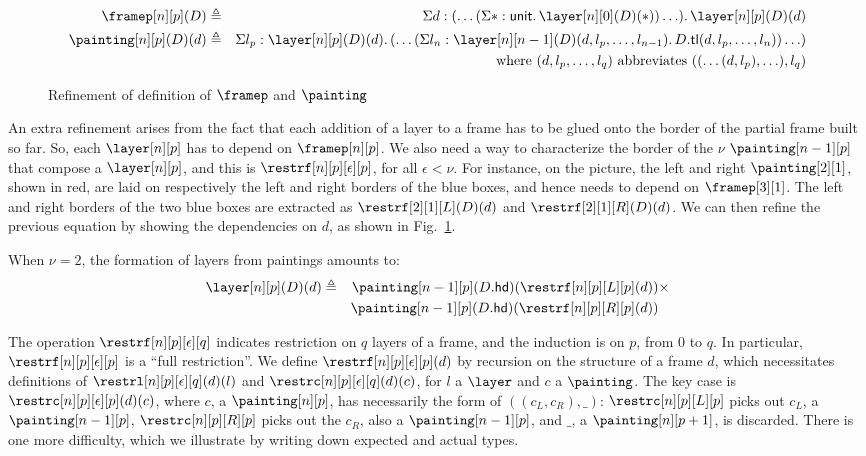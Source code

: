 \documentclass{msc}
\newcommand{\unittype}{\ensuremath{\mathsf{unit}}}
\newcommand{\unitpoint}{\ensuremath{\ast}}
\newcommand{\defeq}{\ensuremath{\triangleq}}
\newcommand{\tl}{\ensuremath{\mathsf{tl}}}
\newcommand{\hd}{\ensuremath{\mathsf{hd}}}
\begin{document}
\begin{figure}[H]
  \begin{align*}
    \framep[n][p](D)      & \defeq & \Sigma d: (\ldots (\Sigma \unitpoint: \unittype.\, \layer[n][0](D)(\unitpoint)) \ldots).\, \layer[n][p](D)(d)                                \\
    \painting[n][p](D)(d) & \defeq & \Sigma l_p: \layer[n][p](D)(d).\, (\ldots (\Sigma l_n: \layer[n][n - 1](D)(d, l_p, \ldots, l_{n - 1}).\, D.\tl(d, l_p, \ldots, l_n)) \ldots) \\
                          &        & \text{where } (d, l_p, \ldots, l_q) \text{ abbreviates } ((\ldots(d, l_p), \ldots), l_q)
  \end{align*}
  \caption{Refinement of definition of $\framep$ and $\painting$\label{fig:refinement}}
\end{figure}

An extra refinement arises from the fact that each addition of a layer to a frame has to be glued onto the border of the partial frame built so far. So, each $\layer[n][p]$ has to depend on $\framep[n][p]$. We also need a way to characterize the border of the $\nu$ $\painting[n-1][p]$ that compose a $\layer[n][p]$, and this is $\restrf[n][p][\epsilon][p]$, for all $\epsilon < \nu$. For instance, on the picture, the left and right $\painting[2][1]$, shown in red, are laid on respectively the left and right borders of the blue boxes, and hence needs to depend on $\framep[3][1]$. The left and right borders of the two blue boxes are extracted as $\restrf[2][1][L](D)(d)$ and $\restrf[2][1][R](D)(d)$. We can then refine the previous equation by showing the dependencies on $d$, as shown in Fig.~\ref{fig:refinement}.

When $\nu = 2$, the formation of layers from paintings amounts to:
\begin{align*}
  \layer[n][p](D)(d) & \defeq & \painting[n-1][p](D.\hd)(\restrf[n][p][L][p](d)) & \times \\
                     &        & \painting[n-1][p](D.\hd)(\restrf[n][p][R][p](d)) &
\end{align*}

The operation $\restrf[n][p][\epsilon][q]$ indicates restriction on $q$ layers of a frame, and the induction is on $p$, from $0$ to $q$. In particular, $\restrf[n][p][\epsilon][p]$ is a ``full restriction''. We define $\restrf[n][p][\epsilon][p](d)$ by recursion on the structure of a frame $d$, which necessitates definitions of $\restrl[n][p][\epsilon][q](d)(l)$ and $\restrc[n][p][\epsilon][q](d)(c)$, for $l$ a $\layer$ and $c$ a $\painting$. The key case is $\restrc[n][p][\epsilon][p](d)(c)$, where $c$, a $\painting[n][p]$, has necessarily the form of $((c_L, c_R), \_)$: $\restrc[n][p][L][p]$ picks out $c_L$, a $\painting[n-1][p]$, $\restrc[n][p][R][p]$ picks out the $c_R$, also a $\painting[n-1][p]$, and $\_$, a $\painting[n][p+1]$, is discarded. There is one more difficulty, which we illustrate by writing down expected and actual types.
\end{document}
